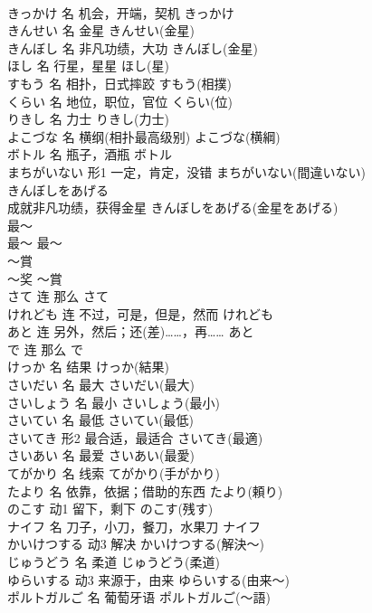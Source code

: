 \documentclass[8pt]{extreport}
\begin{document}
\begin{CJK}{UTF8}{min}
\\	きっかけ	名	机会，开端，契机	きっかけ	
\\	きんせい	名	金星	きんせい(金星)	
\\	きんぼし	名	非凡功绩，大功	きんぼし(金星)	
\\	ほし	名	行星，星星	ほし(星)	
\\	すもう	名	相扑，日式摔跤	すもう(相撲)	
\\	くらい	名	地位，职位，官位	くらい(位)	
\\	りきし	名	力士	りきし(力士)	
\\	よこづな	名	横纲(相扑最高级别)	よこづな(横綱)	
\\	ボトル	名	瓶子，酒瓶	ボトル	
\\	まちがいない	形1	一定，肯定，没错	まちがいない(間違いない)	
\\	きんぼしをあげる	
\\	成就非凡功绩，获得金星	きんぼしをあげる(金星をあげる)	
\\	最～	
\\	最～	最～	
\\	～賞	
\\	～奖	～賞	
\\	さて	连	那么	さて	
\\	けれども	连	不过，可是，但是，然而	けれども	
\\	あと	连	另外，然后；还(差)……，再……	あと	
\\	で	连	那么	で	
\\	けっか	名	结果	けっか(結果)	
\\	さいだい	名	最大	さいだい(最大)	
\\	さいしょう	名	最小	さいしょう(最小)	
\\	さいてい	名	最低	さいてい(最低)	
\\	さいてき	形2	最合适，最适合	さいてき(最適)	
\\	さいあい	名	最爱	さいあい(最愛)	
\\	てがかり	名	线索	てがかり(手がかり)	
\\	たより	名	依靠，依据；借助的东西	たより(頼り)	
\\	のこす	动1	留下，剩下	のこす(残す)	
\\	ナイフ	名	刀子，小刀，餐刀，水果刀	ナイフ	
\\	かいけつする	动3	解决	かいけつする(解決～)	
\\	じゅうどう	名	柔道	じゅうどう(柔道)	
\\	ゆらいする	动3	来源于，由来	ゆらいする(由来～)	
\\	ポルトガルご	名	葡萄牙语	ポルトガルご(～語)	

\end{CJK}
\end{document}
